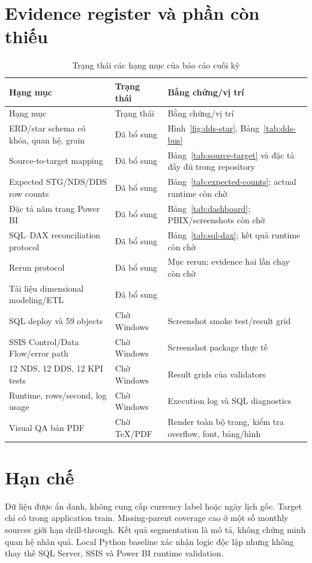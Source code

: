 \documentclass[12pt,a4paper,oneside]{report}
\begin{document}
\section{Evidence register và phần còn thiếu}
\begin{longtable}{p{5.2cm}p{2.7cm}p{6.2cm}}
\caption{Trạng thái các hạng mục của báo cáo cuối kỳ}\label{tab:evidence-register}\\
\toprule
Hạng mục & Trạng thái & Bằng chứng/vị trí \\
\midrule
\endfirsthead
\toprule Hạng mục & Trạng thái & Bằng chứng/vị trí \\
\midrule
\endhead
ERD/star schema có khóa, quan hệ, grain & Đã bổ sung & Hình~\ref{fig:dds-star}, Bảng~\ref{tab:dds-bus} \\
Source-to-target mapping & Đã bổ sung & Bảng~\ref{tab:source-target} và đặc tả đầy đủ trong repository \\
Expected STG/NDS/DDS row counts & Đã bổ sung & Bảng~\ref{tab:expected-counts}; actual runtime còn chờ \\
Đặc tả năm trang Power BI & Đã bổ sung & Bảng~\ref{tab:dashboard}; PBIX/screenshots còn chờ \\
SQL--DAX reconciliation protocol & Đã bổ sung & Bảng~\ref{tab:sql-dax}; kết quả runtime còn chờ \\
Rerun protocol & Đã bổ sung & Mục rerun; evidence hai lần chạy còn chờ \\
Tài liệu dimensional modeling/ETL & Đã bổ sung & \cite{kimball4step,powerbistar,ssisflow} \\
SQL deploy và 59 objects & Chờ Windows & Screenshot smoke test/result grid \\
SSIS Control/Data Flow/error path & Chờ Windows & Screenshot package thực tế \\
12 NDS, 12 DDS, 12 KPI tests & Chờ Windows & Result grids của validators \\
Runtime, rows/second, log usage & Chờ Windows & Execution log và SQL diagnostics \\
Visual QA bản PDF & Chờ TeX/PDF & Render toàn bộ trang, kiểm tra overflow, font, bảng/hình \\
\bottomrule
\end{longtable}

\section{Hạn chế}
Dữ liệu được ẩn danh, không cung cấp currency label hoặc ngày lịch gốc. Target chỉ có trong application train. Missing-parent coverage cao ở một số monthly sources giới hạn drill-through. Kết quả segmentation là mô tả, không chứng minh quan hệ nhân quả. Local Python baseline xác nhận logic độc lập nhưng không thay thế SQL Server, SSIS và Power BI runtime validation.
\end{document}
